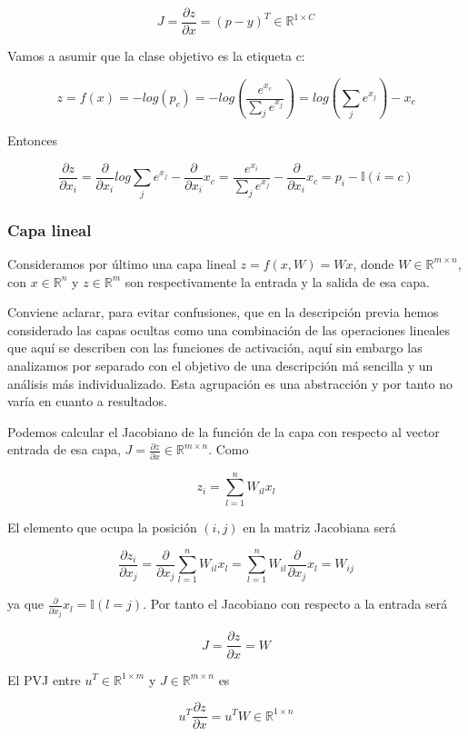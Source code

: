 $$J= \frac{\partial z}{\partial x}= (p-y)^T \in \mathbb{R}^{1\times C}$$

Vamos a asumir que la clase objetivo es la etiqueta c:

$$z=f(x)=-log(p_c)=-log \left (\frac{e^{x_c}}{\sum_j e^{x_j}} \right ) = log \left ( \sum_j e^{x_j} \right ) - x_c$$

Entonces

$$\frac{\partial z}{\partial x_i} = \frac{\partial}{\partial x_i} log \sum_j e^{x_j} - \frac{\partial}{\partial x_i}x_c = \frac{e^{x_i}}{\sum_j e^{x_j}} - \frac{\partial}{\partial x_i}x_c = p_i - \mathbb{I}(i=c)$$

\subsubsection{Capa lineal}



Consideramos por último una capa lineal $z=f(x,W)=Wx$, donde $W \in \mathbb{R}^{m \times n}$, con $x \in \mathbb{R}^n$ y $z \in \mathbb{R}^m$ son respectivamente la entrada y la salida de esa capa.

Conviene aclarar, para evitar confusiones, que en la descripción previa hemos considerado las capas ocultas como una combinación de las operaciones lineales que aquí se describen con las funciones de activación, aquí sin embargo las analizamos por separado con el objetivo de una descripción má sencilla y un análisis más individualizado. Esta agrupación es una abstracción y por tanto no varía en cuanto a resultados.


Podemos calcular el Jacobiano de la función de la capa con respecto al vector entrada de esa capa, $J=\frac{\partial z}{\partial x} \in \mathbb{R}^{m \times n}$. Como

$$z_i = \sum_{l=1}^n W_{il}x_l$$

El elemento que ocupa la posición $(i,j)$ en la matriz Jacobiana será 

$$\frac{\partial z_i}{\partial x_j} = \frac{\partial}{\partial x_j} \sum_{l=1}^n W_{il} x_l = \sum_{l=1}^n W_{il} \frac{\partial}{\partial x_j} x_l = W_{ij}$$

ya que $\frac{\partial}{\partial x_j} x_l= \mathbb{I} (l=j)$. Por tanto el Jacobiano con respecto a la entrada será

$$J=\frac{\partial z}{\partial x}=W$$

El PVJ entre $u^T \in \mathbb{R}^{1 \times m}$ y $J \in \mathbb{R}^{m \times n}$ es

$$u^T \frac{\partial z}{\partial x} = u^T W \in \mathbb{R}^{1 \times n}$$

